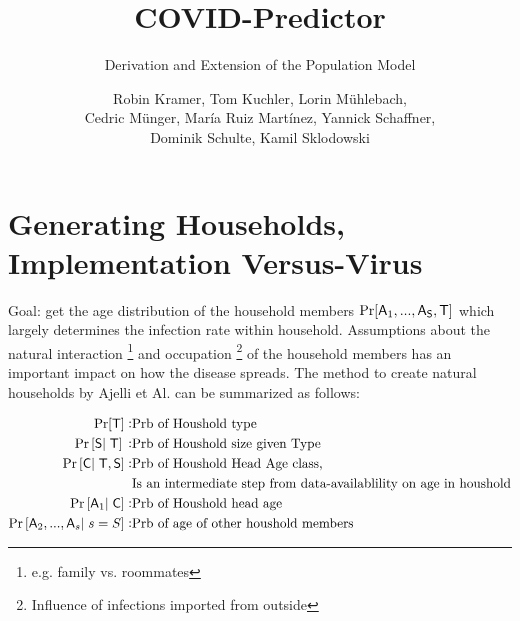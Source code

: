 \documentclass[]{scrartcl}
\title{COVID-Predictor}
\subtitle{Derivation and Extension of the Population Model}
\author{Robin Kramer, Tom Kuchler, Lorin M{\"u}hlebach, \\Cedric M{\"u}nger, Mar{\'i}a Ruiz
	Martínez, Yannick Schaffner, \\Dominik Schulte, Kamil Sklodowski
}
\newcommand{\rnd}[1]{\mathsf{#1} }
\begin{document}
\maketitle

%

\section{Generating Households, Implementation Versus-Virus}
Goal: get the age distribution of the household members $\prb{\rnd A_1,...,\rnd A_{\rnd S},\rnd T}$
which largely determines the infection rate within household. Assumptions about the natural interaction \footnote{e.g. family vs. roommates} and occupation \footnote{Influence of infections imported from outside} of the household members has an important impact on how the disease spreads.
The method to create natural households by Ajelli et Al. can be summarized as follows:

\begin{align}
  \prb{\rnd T}{}: &\text{Prb of Houshold type }\\
  \prbCond{\rnd S}{\rnd T}{}{}: & \text{Prb of Houshold size given Type}\\
  \prbCond{\rnd C}{\rnd T,\rnd S}:  & \text{Prb of Houshold Head Age class, }\\
  &\text{Is an intermediate step from data-availablility on age in houshold}\notag\\
  \prbCond{\rnd A_1}{\rnd C}: & \text{Prb of Houshold head age}\\
  \prbCond{\rnd A_2,...,\rnd A_s}{s=S}: &\text{Prb of age of other houshold members}
\end{align}
\end{document}
